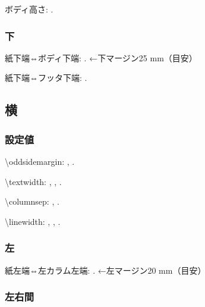 \documentclass{FITpaper}
\begin{document}
ボディ高さ:
\prntlen{\textheight}.

\subsubsection{下}

\newlength{\mybottom}
\setlength\mybottom{\paperheight}

\addtolength{\mybottom}{-\mytop}
\addtolength{\mybottom}{-\textheight}

紙下端⇔ボディ下端:
\prntlen{\mybottom}.
←下マージン25 mm（目安）

\addtolength\mybottom{-\footskip}

紙下端⇔フッタ下端:
\prntlen{\mybottom}.

\subsection{横}

\subsubsection{設定値}

\textbackslash oddsidemargin:
\prntlen{\oddsidemargin},
\prntlen{\oddsidemargin}.

\textbackslash textwidth:
\prntlen{\textwidth},
\prntlen{\textwidth},
\prntlen{\textwidth}.

\textbackslash columnsep:
\prntlen{\columnsep},
\prntlen{\columnsep}.

\textbackslash linewidth:
\prntlen{\linewidth},
\prntlen{\linewidth},
\prntlen{\linewidth}.

\subsubsection{左}

\newlength{\myleft}
\setlength{\myleft}{\oddsidemargin}

\addtolength\myleft{1in}

紙左端⇔左カラム左端:
\prntlen{\myleft}.
←左マージン20 mm（目安）

\subsubsection{左右間}
\end{document}

